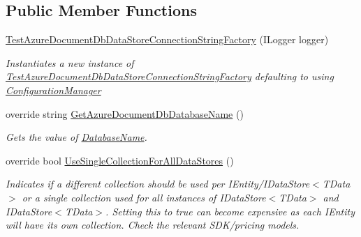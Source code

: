 \subsection*{Public Member Functions}
\begin{DoxyCompactItemize}
\item 
\hyperlink{classCqrs_1_1Ninject_1_1Azure_1_1DocumentDb_1_1Factories_1_1TestAzureDocumentDbDataStoreConnectionStringFactory_ad55763a7e19193cfecf2abca3759f2c6_ad55763a7e19193cfecf2abca3759f2c6}{Test\+Azure\+Document\+Db\+Data\+Store\+Connection\+String\+Factory} (I\+Logger logger)
\begin{DoxyCompactList}\small\item\em Instantiates a new instance of \hyperlink{classCqrs_1_1Ninject_1_1Azure_1_1DocumentDb_1_1Factories_1_1TestAzureDocumentDbDataStoreConnectionStringFactory}{Test\+Azure\+Document\+Db\+Data\+Store\+Connection\+String\+Factory} defaulting to using \hyperlink{classCqrs_1_1Azure_1_1DocumentDb_1_1Factories_1_1AzureDocumentDbDataStoreConnectionStringFactory_a7d0a40bb03e9e15306023bf97094cf60_a7d0a40bb03e9e15306023bf97094cf60}{Configuration\+Manager} \end{DoxyCompactList}\item 
override string \hyperlink{classCqrs_1_1Ninject_1_1Azure_1_1DocumentDb_1_1Factories_1_1TestAzureDocumentDbDataStoreConnectionStringFactory_ab4b864396b790819609d3337dfb3f75d_ab4b864396b790819609d3337dfb3f75d}{Get\+Azure\+Document\+Db\+Database\+Name} ()
\begin{DoxyCompactList}\small\item\em Gets the value of \hyperlink{classCqrs_1_1Ninject_1_1Azure_1_1DocumentDb_1_1Factories_1_1TestAzureDocumentDbDataStoreConnectionStringFactory_ae0da37bd91333ad782058d32d4de2594_ae0da37bd91333ad782058d32d4de2594}{Database\+Name}. \end{DoxyCompactList}\item 
override bool \hyperlink{classCqrs_1_1Ninject_1_1Azure_1_1DocumentDb_1_1Factories_1_1TestAzureDocumentDbDataStoreConnectionStringFactory_aeac8ecfdbb2d1d7f18105f2e535c51fe_aeac8ecfdbb2d1d7f18105f2e535c51fe}{Use\+Single\+Collection\+For\+All\+Data\+Stores} ()
\begin{DoxyCompactList}\small\item\em Indicates if a different collection should be used per I\+Entity/I\+Data\+Store$<$\+T\+Data$>$ or a single collection used for all instances of I\+Data\+Store$<$\+T\+Data$>$ and I\+Data\+Store$<$\+T\+Data$>$. Setting this to true can become expensive as each I\+Entity will have it\textquotesingle{}s own collection. Check the relevant S\+D\+K/pricing models. \end{DoxyCompactList}\end{DoxyCompactItemize}
